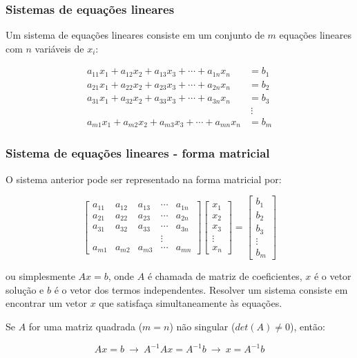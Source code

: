 \begin{frame}
    \frametitle{Sistemas de equações lineares}
    Um sistema de equações lineares consiste em um conjunto de $m$ equações lineares com $n$ variáveis de $x_i$:

    \begin{align*}
        a_{11} x_1 + a_{12} x_2 + a_{13} x_3 + \cdots  + a_{1n} x_n & =  b_1 \\
        a_{21} x_1 + a_{22} x_2 + a_{23} x_3 + \cdots + a_{2n} x_n & =  b_2 \\
        a_{31} x_1 + a_{32} x_2 + a_{33} x_3 + \cdots + a_{3n} x_n & = b_3 \\
                                                                   & ~\vdots~ \\
        a_{m1} x_1 + a_{m2} x_2 + a_{m3} x_3 + \cdots  + a_{mn} x_n & =  b_m
    \end{align*}
\end{frame}

\begin{frame}
    \frametitle{Sistema de equações lineares - forma matricial}
    O sistema anterior pode ser representado na forma matricial por:

    \[
        \begin{bmatrix}
            a_{11} & a_{12} & a_{13} & \cdots & a_{1n}  \\
            a_{21} & a_{22} & a_{23} & \cdots & a_{2n}  \\
            a_{31} & a_{32} & a_{33} & \cdots & a_{3n}  \\
                   &        &        & \vdots &         \\
            a_{m1} & a_{m2} & a_{m3} & \cdots & a_{mn}
        \end{bmatrix}
        \begin{bmatrix}
            x_1 \\ x_2 \\ x_3 \\ \vdots \\ x_n
        \end{bmatrix}=
        \begin{bmatrix}
            b_1 \\ b_2 \\ b_3 \\ \vdots \\ b_m
        \end{bmatrix}
    \]

    ou simplesmente $Ax=b$, onde $A$ é chamada de matriz de coeficientes, $x$ é o vetor solução e $b$ é o vetor dos termos independentes. Resolver um sistema consiste em encontrar um vetor $x$ que satisfaça simultaneamente às equações.

    \pause

    Se $A$ for uma matriz quadrada ($m = n$) não singular ($det(A) \neq 0$), então:

    \[
        Ax=b ~\rightarrow~ A^{-1}Ax=A^{-1}b ~\rightarrow~ x=A^{-1}b
    \]
\end{frame}

